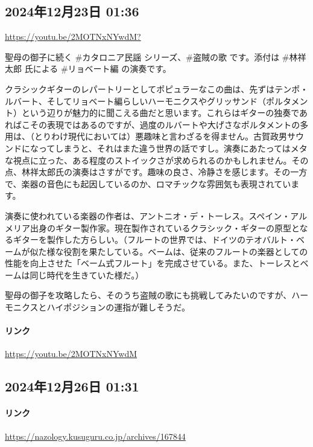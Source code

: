 \subsection*{2024年12月23日 01:36}

\url{https://youtu.be/2MOTNxNYwdM?}

聖母の御子に続く \#カタロニア民謡 シリーズ、\#盗賊の歌 です。添付は \#林祥太郎 氏による \#リョベート編 の演奏です。

クラシックギターのレパートリーとしてポピュラーなこの曲は、先ずはテンポ・ルバート、そしてリョベート編らしいハーモニクスやグリッサンド（ポルタメント）という辺りが魅力的に聞こえる曲だと思います。これらはギターの独奏であればこその表現ではあるのですが、過度のルバートや大げさなポルタメントの多用は、（とりわけ現代においては）悪趣味と言わざるを得ません。古賀政男サウンドになってしまうと、それはまた違う世界の話ですし。演奏にあたってはメタな視点に立った、ある程度のストイックさが求められるのかもしれません。その点、林祥太郎氏の演奏はさすがです。趣味の良さ、冷静さを感じます。その一方で、楽器の音色にも起因しているのか、ロマチックな雰囲気も表現されています。

演奏に使われている楽器の作者は、アントニオ・デ・トーレス。スペイン・アルメリア出身のギター製作家。現在製作されているクラシック・ギターの原型となるギターを製作した方らしい。（フルートの世界では、ドイツのテオバルト・ベームが似た様な役割を果たしている。ベームは、従来のフルートの楽器としての性能を向上させた「ベーム式フルート」を完成させている。また、トーレスとベームは同じ時代を生きていた様だ。）

聖母の御子を攻略したら、そのうち盗賊の歌にも挑戦してみたいのですが、ハーモニクスとハイポジションの運指が難しそうだ。

\paragraph{リンク}
\url{https://youtu.be/2MOTNxNYwdM}

\subsection*{2024年12月26日 01:31}

\paragraph{リンク}
\url{https://nazology.kusuguru.co.jp/archives/167844}

